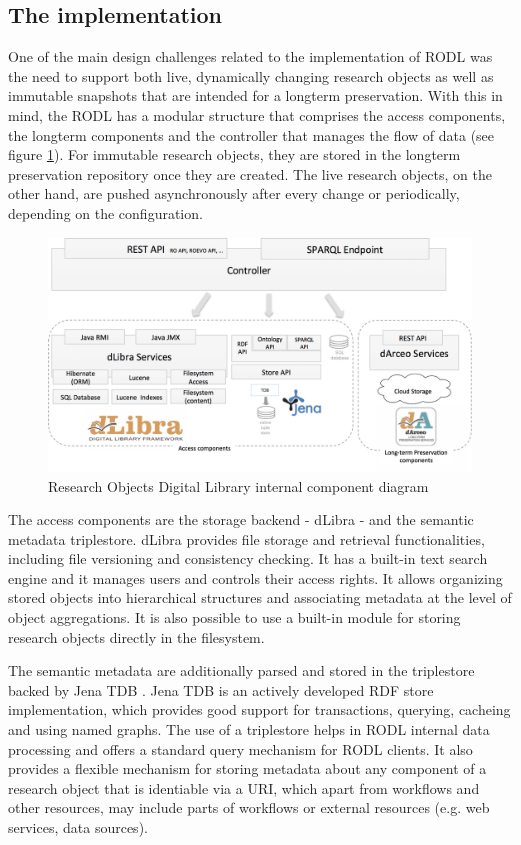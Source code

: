 \subsection{The implementation}

One of the main design challenges related to the implementation of RODL was the need to support both live, dynamically changing research objects as well as immutable snapshots that are intended for a longterm preservation. With this in mind, the RODL has a modular structure that comprises the access components, the longterm components and the controller that manages the flow of data (see figure \ref{RODL}). For immutable research objects, they are stored in the longterm preservation repository once they are created. The live research objects, on the other hand, are pushed asynchronously after every change or periodically, depending on the configuration.

\begin{figure}[!hb]
\centering
\includegraphics[width=\textwidth]{Figures/RODL-new.png}
\caption{Research Objects Digital Library internal component diagram}
\label{RODL}
\end{figure}


The access components are the storage backend - dLibra \cite{dLibra} - and the semantic metadata triplestore. dLibra provides file storage and retrieval functionalities, including file versioning and consistency checking. It has a built-in text search engine and it manages users and controls their access rights. It allows organizing stored objects into hierarchical structures and associating metadata at the level of object aggregations. It is also possible to use a built-in module for storing research objects directly in the filesystem.

The semantic metadata are additionally parsed and stored in the triplestore backed by Jena TDB \cite{Jena}. Jena TDB is an actively developed RDF store implementation, which provides good support for transactions, querying, cacheing and using named graphs. The use of a triplestore helps in RODL internal data processing and offers a standard query mechanism for RODL clients. It also provides a flexible mechanism for storing metadata about any component of a research object that is identiable via a URI, which apart from workflows and other resources, may include parts of workflows or external resources (e.g. web services, data sources).

